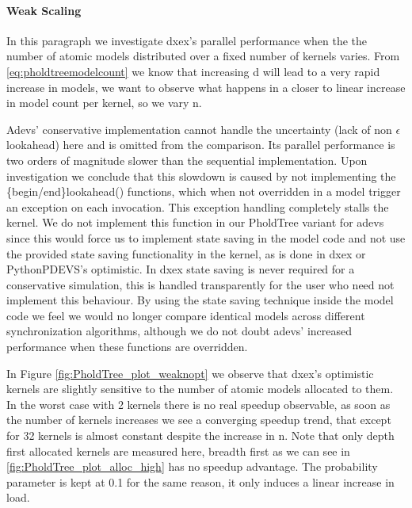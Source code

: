 \paragraph*{Weak Scaling}
In this paragraph we investigate dxex's parallel performance when the the number of atomic models distributed over a fixed number of kernels varies. From \ref{eq:pholdtreemodelcount} we know that increasing d will lead to a very rapid increase in models, we want to observe what happens in a closer to linear increase in model count per kernel, so we vary n. 

Adevs' conservative implementation cannot handle the uncertainty (lack of non $\epsilon$ lookahead) here and is omitted from the comparison. Its parallel performance is two orders of magnitude slower than the sequential implementation. Upon investigation we conclude that this slowdown is caused by not implementing the \{begin/end\}lookahead() functions, which when not overridden in a model trigger an exception on each invocation. 
This exception handling completely stalls the kernel. We do not implement this function in our PholdTree variant for adevs since this would force us to implement state saving in the model code and not use the provided state saving functionality in the kernel, as is done in dxex or PythonPDEVS's optimistic.
In dxex state saving is never required for a conservative simulation, this is handled transparently for the user who need not implement this behaviour. 
By using the state saving technique inside the model code we feel we would no longer compare identical models across different synchronization algorithms, although we do not doubt adevs' increased performance when these functions are overridden.

In Figure \ref{fig:PholdTree_plot_weaknopt} we observe that dxex's optimistic kernels are slightly sensitive to the number of atomic models allocated to them. In the worst case with 2 kernels there is no real speedup observable, as soon as the number of kernels increases we see a converging speedup trend, that except for 32 kernels is almost constant despite the increase in n. Note that only depth first allocated kernels are measured here, breadth first as we can see in \ref{fig:PholdTree_plot_alloc_high} has no speedup advantage. The probability parameter is kept at 0.1 for the same reason, it only induces a linear increase in load.

